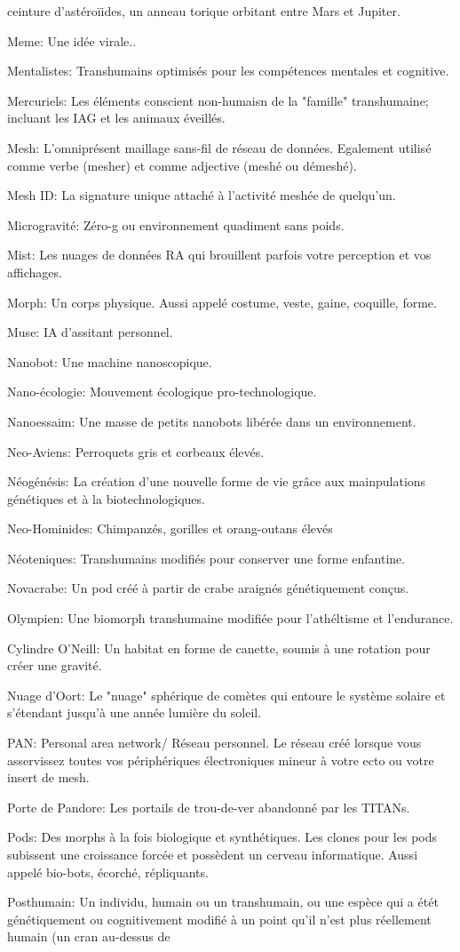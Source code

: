 ceinture d'astéroïides, un anneau torique orbitant entre Mars et Jupiter. \item Meme: Une idée virale.. \item Mentalistes: Transhumains optimisés pour les compétences mentales et cognitive. \item Mercuriels: Les éléments conscient non-humaisn de la "famille" transhumaine; incluant les IAG et les animaux éveillés. \item Mesh: L'omniprésent maillage sans-fil de réseau de données. Egalement utilisé comme verbe (mesher) et comme adjective (meshé ou démeshé). \item Mesh ID: La signature unique attaché à l'activité meshée de quelqu'un. \item Microgravité: Zéro-g ou environnement quadiment sans poids. \item Mist: Les nuages de données RA qui brouillent parfois votre perception et vos affichages. \item Morph: Un corps physique. Aussi appelé costume, veste, gaine, coquille, forme. \item Muse: IA d'assitant personnel. \item Nanobot: Une machine nanoscopique. \item Nano-écologie: Mouvement écologique pro-technologique. \item Nanoessaim: Une masse de petits nanobots libérée dans un environnement. \item Neo-Aviens: Perroquets gris et corbeaux élevés. \item Néogénésis: La création d'une nouvelle forme de vie grâce aux mainpulations génétiques et à la biotechnologiques. \item Neo-Hominides: Chimpanzés, gorilles et orang-outans élevés \item Néoteniques: Transhumains modifiés pour conserver une forme enfantine. \item Novacrabe: Un pod créé à partir de crabe araignés génétiquement conçus. \item Olympien: Une biomorph transhumaine modifiée pour l'athéltisme et l'endurance. \item Cylindre O'Neill: Un habitat en forme de canette, soumis à une rotation pour créer une gravité. \item Nuage d'Oort: Le "nuage" sphérique de comètes qui entoure le système solaire et s'étendant jusqu'à une année lumière du soleil. \item PAN: Personal area network/ Réseau personnel. Le réseau créé lorsque vous asservissez toutes vos périphériques électroniques mineur à votre ecto ou votre insert de mesh. \item Porte de Pandore: Les portails de trou-de-ver abandonné par les TITANs. \item Pods: Des morphs à la fois biologique et synthétiques. Les clones pour les pods subissent une croissance forcée et possèdent un cerveau informatique. Aussi appelé bio-bots, écorché, répliquants. \item Posthumain: Un individu, humain ou un transhumain, ou une espèce qui a étét génétiquement ou cognitivement modifié à un point qu'il n'est plus réellement humain (un cran au-dessus de 